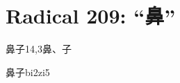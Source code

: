 
\section*{Radical 209: ``⿐''}

\begin{entry}{鼻子}{14,3}{⿐、⼦}
  \begin{phonetics}{鼻子}{bi2zi5}
  \end{phonetics}
\end{entry}


